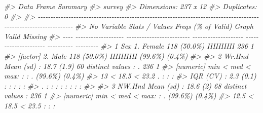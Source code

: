 \documentclass[
]{book}
\newenvironment{Shaded}{\begin{snugshade}}{\end{snugshade}}
\newcommand{\CommentTok}[1]{\textcolor[rgb]{0.56,0.35,0.01}{\textit{#1}}}
\begin{document}
\begin{Shaded}
\begin{Highlighting}[]
\CommentTok{\#\textgreater{} Data Frame Summary  }
\CommentTok{\#\textgreater{} survey  }
\CommentTok{\#\textgreater{} Dimensions: 237 x 12  }
\CommentTok{\#\textgreater{} Duplicates: 0  }
\CommentTok{\#\textgreater{} }
\CommentTok{\#\textgreater{} {-}{-}{-}{-}{-}{-}{-}{-}{-}{-}{-}{-}{-}{-}{-}{-}{-}{-}{-}{-}{-}{-}{-}{-}{-}{-}{-}{-}{-}{-}{-}{-}{-}{-}{-}{-}{-}{-}{-}{-}{-}{-}{-}{-}{-}{-}{-}{-}{-}{-}{-}{-}{-}{-}{-}{-}{-}{-}{-}{-}{-}{-}{-}{-}{-}{-}{-}{-}{-}{-}{-}{-}{-}{-}{-}{-}{-}{-}{-}{-}{-}{-}{-}{-}{-}{-}{-}{-}{-}{-}{-}{-}{-}{-}{-}{-}{-}{-}{-}{-}{-}{-}{-}{-}{-}{-}{-}{-}{-}{-}{-}{-}{-}{-}}
\CommentTok{\#\textgreater{} No   Variable            Stats / Values            Freqs (\% of Valid)   Graph                 Valid      Missing  }
\CommentTok{\#\textgreater{} {-}{-}{-}{-} {-}{-}{-}{-}{-}{-}{-}{-}{-}{-}{-}{-}{-}{-}{-}{-}{-}{-}{-} {-}{-}{-}{-}{-}{-}{-}{-}{-}{-}{-}{-}{-}{-}{-}{-}{-}{-}{-}{-}{-}{-}{-}{-}{-} {-}{-}{-}{-}{-}{-}{-}{-}{-}{-}{-}{-}{-}{-}{-}{-}{-}{-}{-}{-} {-}{-}{-}{-}{-}{-}{-}{-}{-}{-}{-}{-}{-}{-}{-}{-}{-}{-}{-}{-}{-} {-}{-}{-}{-}{-}{-}{-}{-}{-}{-} {-}{-}{-}{-}{-}{-}{-}{-}{-}}
\CommentTok{\#\textgreater{} 1    Sex                 1. Female                 118 (50.0\%)          IIIIIIIIII            236        1        }
\CommentTok{\#\textgreater{}      [factor]            2. Male                   118 (50.0\%)          IIIIIIIIII            (99.6\%)    (0.4\%)   }
\CommentTok{\#\textgreater{} }
\CommentTok{\#\textgreater{} 2    Wr.Hnd              Mean (sd) : 18.7 (1.9)    60 distinct values           : .           236        1        }
\CommentTok{\#\textgreater{}      [numeric]           min \textless{} med \textless{} max:                                       : : .         (99.6\%)    (0.4\%)   }
\CommentTok{\#\textgreater{}                          13 \textless{} 18.5 \textless{} 23.2                                     . : : :                             }
\CommentTok{\#\textgreater{}                          IQR (CV) : 2.3 (0.1)                                 : : : : :                           }
\CommentTok{\#\textgreater{}                                                                         .   : : : : : : : :                       }
\CommentTok{\#\textgreater{} }
\CommentTok{\#\textgreater{} 3    NW.Hnd              Mean (sd) : 18.6 (2)      68 distinct values           :             236        1        }
\CommentTok{\#\textgreater{}      [numeric]           min \textless{} med \textless{} max:                                       : .           (99.6\%)    (0.4\%)   }
\CommentTok{\#\textgreater{}                          12.5 \textless{} 18.5 \textless{} 23.5                                     : : :                             }

\end{Highlighting}
\end{Shaded}
\end{document}
